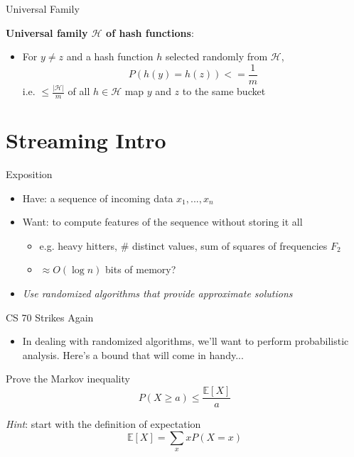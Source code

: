 \documentclass[10pt]{beamer}
\begin{document}
\begin{frame}[fragile]{Universal Family}

\textbf{Universal family $\mathcal{H}$ of hash functions}:
\begin{itemize}
\item For $y \neq z$ and a hash function $h$ selected randomly from $\mathcal{H}$,
$$P(h(y) = h(z)) <= \frac{1}{m}$$
i.e. $\leq \frac{|\mathcal{H}|}{m}$ of all $h \in \mathcal{H}$ map $y$ and $z$ to the same bucket
\end{itemize}

\end{frame}

\section{Streaming Intro}

\begin{frame}[fragile]{Exposition}

\begin{itemize}
\item Have: a sequence of incoming data $x_1, ..., x_n$
\item Want: to compute features of the sequence without storing it all
  \begin{itemize}
  \item e.g. heavy hitters, \# distinct values, sum of squares of frequencies $F_2$
  \item $\approx O(\log{n})$ bits of memory?
  \end{itemize}
\item \textit{Use randomized algorithms that provide approximate solutions}
\end{itemize}

\end{frame}

\begin{frame}[fragile]{CS 70 Strikes Again}

\begin{itemize}
\item In dealing with randomized algorithms, we'll want to perform probabilistic analysis. Here's a bound that will come in handy...
\end{itemize}

Prove the Markov inequality
$$P(X \geq a) \leq \frac{\mathbb{E}[X]}{a}$$

\textit{Hint}: start with the definition of expectation
$$\mathbb{E}[X] = \sum_xxP(X = x)$$

\end{frame}
\end{document}
